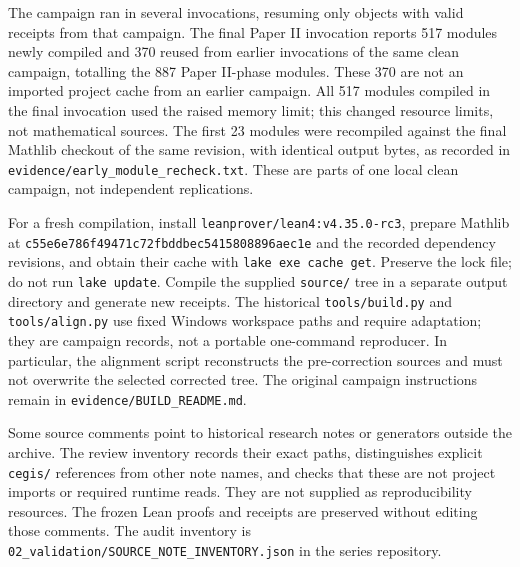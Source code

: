 \documentclass[english,11pt,a4paper]{article}
\begin{document}
The campaign ran in several invocations, resuming only objects with valid receipts from that campaign. The final Paper II invocation reports 517 modules newly compiled and 370 reused from earlier invocations of the same clean campaign, totalling the 887 Paper II-phase modules. These 370 are not an imported project cache from an earlier campaign. All 517 modules compiled in the final invocation used the raised memory limit; this changed resource limits, not mathematical sources. The first 23 modules were recompiled against the final Mathlib checkout of the same revision, with identical output bytes, as recorded in \texttt{evidence/\allowbreak{}ear\allowbreak{}ly\_\allowbreak{}module\_\allowbreak{}re\allowbreak{}check.\allowbreak{}txt}. These are parts of one local clean campaign, not independent replications.

For a fresh compilation, install \texttt{leanprover/\allowbreak{}l\allowbreak{}ean4:v4.\allowbreak{}35.\allowbreak{}0\allowbreak{}-\allowbreak{}rc3}, prepare Mathlib at \texttt{c55e6e78\allowbreak{}6f49\allowbreak{}471c\allowbreak{}72fbddbe\allowbreak{}\allowbreak{}c5415808\allowbreak{}896a\allowbreak{}ec1e\allowbreak{}} and the recorded dependency revisions, and obtain their cache with \texttt{lake exe cac\allowbreak{}he get}. Preserve the lock file; do not run \texttt{lake update}. Compile the supplied \texttt{source/\allowbreak{}} tree in a separate output directory and generate new receipts. The historical \texttt{tools/\allowbreak{}build.\allowbreak{}\allowbreak{}py} and \texttt{tools/\allowbreak{}align.\allowbreak{}\allowbreak{}py} use fixed Windows workspace paths and require adaptation; they are campaign records, not a portable one-command reproducer. In particular, the alignment script reconstructs the pre-correction sources and must not overwrite the selected corrected tree. The original campaign instructions remain in \texttt{evidence/\allowbreak{}BUI\allowbreak{}LD\_\allowbreak{}README.\allowbreak{}md\allowbreak{}}.

Some source comments point to historical research notes or generators outside the archive. The review inventory records their exact paths, distinguishes explicit \texttt{cegis/\allowbreak{}} references from other note names, and checks that these are not project imports or required runtime reads. They are not supplied as reproducibility resources. The frozen Lean proofs and receipts are preserved without editing those comments. The audit inventory is \texttt{02\_\allowbreak{}validatio\allowbreak{}n/\allowbreak{}SOURCE\_\allowbreak{}NOT\allowbreak{}E\_\allowbreak{}INVENTORY.\allowbreak{}\allowbreak{}json} in the series repository.
\end{document}
